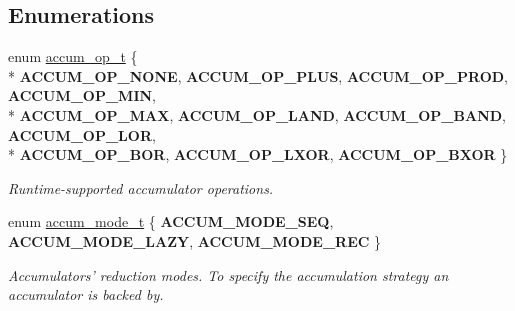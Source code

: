\subsection*{Enumerations}
\begin{DoxyCompactItemize}
\item 
enum \hyperlink{group__Accumulators_ga3e4cb0c11f9af51019be26ec54dab3d5}{accum\-\_\-op\-\_\-t} \{ \\*
{\bfseries A\-C\-C\-U\-M\-\_\-\-O\-P\-\_\-\-N\-O\-N\-E}, 
{\bfseries A\-C\-C\-U\-M\-\_\-\-O\-P\-\_\-\-P\-L\-U\-S}, 
{\bfseries A\-C\-C\-U\-M\-\_\-\-O\-P\-\_\-\-P\-R\-O\-D}, 
{\bfseries A\-C\-C\-U\-M\-\_\-\-O\-P\-\_\-\-M\-I\-N}, 
\\*
{\bfseries A\-C\-C\-U\-M\-\_\-\-O\-P\-\_\-\-M\-A\-X}, 
{\bfseries A\-C\-C\-U\-M\-\_\-\-O\-P\-\_\-\-L\-A\-N\-D}, 
{\bfseries A\-C\-C\-U\-M\-\_\-\-O\-P\-\_\-\-B\-A\-N\-D}, 
{\bfseries A\-C\-C\-U\-M\-\_\-\-O\-P\-\_\-\-L\-O\-R}, 
\\*
{\bfseries A\-C\-C\-U\-M\-\_\-\-O\-P\-\_\-\-B\-O\-R}, 
{\bfseries A\-C\-C\-U\-M\-\_\-\-O\-P\-\_\-\-L\-X\-O\-R}, 
{\bfseries A\-C\-C\-U\-M\-\_\-\-O\-P\-\_\-\-B\-X\-O\-R}
 \}
\begin{DoxyCompactList}\small\item\em Runtime-\/supported accumulator operations. \end{DoxyCompactList}\item 
enum \hyperlink{group__Accumulators_ga82b1a263886373f51b3b30c2e5c5d4c3}{accum\-\_\-mode\-\_\-t} \{ {\bfseries A\-C\-C\-U\-M\-\_\-\-M\-O\-D\-E\-\_\-\-S\-E\-Q}, 
{\bfseries A\-C\-C\-U\-M\-\_\-\-M\-O\-D\-E\-\_\-\-L\-A\-Z\-Y}, 
{\bfseries A\-C\-C\-U\-M\-\_\-\-M\-O\-D\-E\-\_\-\-R\-E\-C}
 \}
\begin{DoxyCompactList}\small\item\em Accumulators' reduction modes. To specify the accumulation strategy an accumulator is backed by. \end{DoxyCompactList}\end{DoxyCompactItemize}
